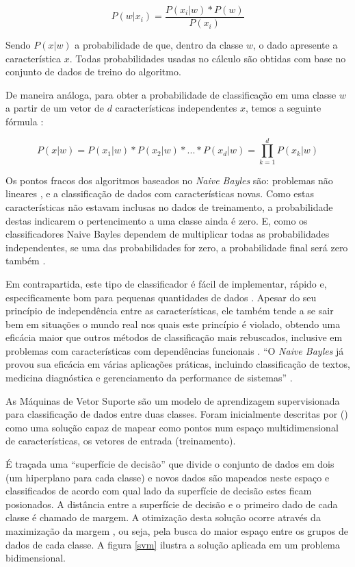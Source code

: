 \documentclass[
	12pt,				%
	openright,			%
	oneside,			%
	a4paper,			%
	english,			%
	spanish,			%
	brazil				%
	]{abntex2}
\begin{document}
	\[ P(w | x_i) = \frac{P(x_i | w)*P(w)}{P(x_i)} \]
	
	Sendo $P(x|w)$ a probabilidade de que, dentro da classe $w$, o dado apresente a característica $x$. Todas probabilidades usadas no cálculo são obtidas com base no conjunto de dados de treino do algoritmo. 
	
	De maneira análoga, para obter a probabilidade de classificação em uma classe $w$ a partir de um vetor de $d$ características independentes \textbf{$x$}, temos a seguinte fórmula  \cite{raschka}:
	
	\[ P(x|w) = P(x_1 | w) * P(x_2 | w) * ... * P(x_d | w) = \prod\limits_{k=1}^d P(x_k | w) \] 
	 
		
	Os pontos fracos dos algoritmos baseados no \emph{Naive Bayles} são: problemas não lineares \cite{raschka}, e a classificação de dados com características novas. Como estas características não estavam inclusas no dados de treinamento, a probabilidade destas indicarem o pertencimento a uma classe ainda é zero. E, como os classificadores Naive Bayles dependem de multiplicar todas as probabilidades independentes, se uma das probabilidades for zero, a probabilidade final será zero também \cite{kirk}.
	
	Em contrapartida, este tipo de classificador é fácil de implementar, rápido e, especificamente bom para pequenas quantidades de dados \cite{raschka}. Apesar do seu princípio de independência entre as características, ele também tende a se sair bem em situações o mundo real nos quais este princípio é violado, obtendo uma eficácia maior que outros métodos de classificação mais rebuscados, inclusive em problemas com características com dependências funcionais \cite{rish}. ``O \emph{Naive Bayles} já provou sua eficácia em várias aplicações práticas, incluindo classificação de textos, medicina diagnóstica e gerenciamento da performance de sistemas'' \cite{rish}. 


	As Máquinas de Vetor Suporte são um modelo de aprendizagem supervisionada para classificação de dados entre duas classes. Foram inicialmente descritas por \citeauthor{cortes} (\citeyear{cortes}) como uma solução capaz de mapear como pontos num espaço multidimensional de características, os vetores de entrada (treinamento). 
	
	É traçada uma ``superfície de decisão'' que divide o conjunto de dados em dois (um hiperplano para cada classe) e novos dados são mapeados neste espaço e classificados de acordo com qual lado da superfície de decisão estes ficam posionados. A distância entre a superfície de decisão e o primeiro dado de cada classe é chamado de margem. A otimização desta solução ocorre através da maximização da margem \cite{r_julian_heart}, ou seja, pela busca do maior espaço entre os grupos de dados de cada classe. \cite{r_julian_heart} A figura \ref{svm} ilustra a solução aplicada em um problema bidimensional.
\end{document}
